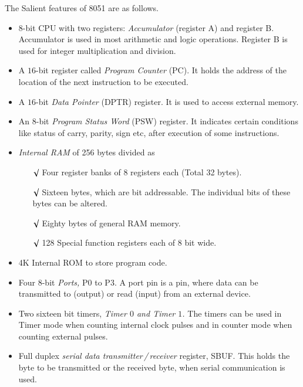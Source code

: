 The Salient features of 8051 are as follows.
\begin{itemize}
\itemsep=0pt
\item $8$-bit CPU with two registers: {\em Accumulator} (register A) and register B. Accumulator is used in most arithmetic and logic operations. Register B is used for integer multiplication and division.

\item A $16$-bit register called {\em Program Counter} (PC). It holds the address of the location of the next instruction to be executed.

\item A $16$-bit {\em Data Pointer} (DPTR) register. It is used to access external memory.

\item An $8$-bit {\em Program Status Word} (PSW) register. It indicates certain conditions like status of carry, parity, sign etc, after execution of some instructions.

\item {\em Internal RAM} of 256 bytes divided as
\begin{itemize}
\itemsep=-.5pt
\item[$\surd$] Four register banks of 8 registers each (Total 32 bytes).

\item[$\surd$] Sixteen bytes, which are bit addressable. The individual bits of these bytes can be altered.

\item[$\surd$] Eighty bytes of general RAM memory.

\item[$\surd$] 128 Special function registers each of 8 bit wide.
\end{itemize}

\item 4K Internal ROM to store program code.

\item Four 8-bit {\em Ports,} P0 to P3. A port pin is a pin, where data can be transmitted to (output) or read (input) from an external device.

\item Two sixteen bit timers, {\em Timer $0$ and Timer $1$.} The timers can be used in Timer mode when counting internal clock pulses and in counter mode when counting external pulses.

\item Full duplex {\em serial data transmitter\,/\,receiver} register, SBUF. This holds the byte to be transmitted or the received byte, when serial communication is used.


\end{itemize}
